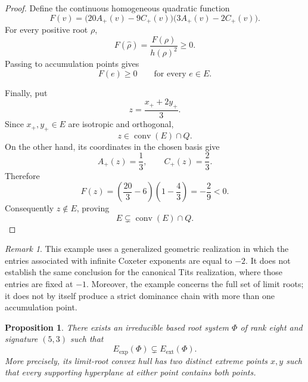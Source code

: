 \documentclass[11pt,reqno]{amsart}
\theoremstyle{plain}
\newtheorem{proposition}[theorem]{Proposition}
\theoremstyle{definition}
\theoremstyle{remark}
\newtheorem{remark}[theorem]{Remark}
\numberwithin{equation}{section}
\begin{document}
\begin{proof}
Define the continuous homogeneous quadratic function
\[
F(v)=
\bigl(20A_+(v)-9C_+(v)\bigr)
\bigl(3A_+(v)-2C_+(v)\bigr).
\]
For every positive root $\rho$,
\[
F(\widehat{\rho})=\frac{F(\rho)}{h(\rho)^2}\geq 0.
\]
Passing to accumulation points gives
\[
F(e)\geq 0
\qquad\text{for every }e\in E.
\]

Finally, put
\[
z=\frac{x_++2y_+}{3}.
\]
Since $x_+,y_+\in E$ are isotropic and orthogonal,
\[
z\in\operatorname{conv}(E)\cap Q.
\]
On the other hand, its coordinates in the chosen basis give
\[
A_+(z)=\frac13,
\qquad
C_+(z)=\frac23.
\]
Therefore
\[
F(z)
=
\left(\frac{20}{3}-6\right)
\left(1-\frac43\right)
=
-\frac29<0.
\]
Consequently $z\notin E$, proving
\[
E\subsetneq\operatorname{conv}(E)\cap Q.
\]
\end{proof}

\begin{remark}
This example uses a generalized geometric realization in
which the entries associated with infinite Coxeter exponents
are equal to $-2$.
It does not establish the same conclusion for the canonical
Tits realization, where those entries are fixed at $-1$.
Moreover, the example concerns the full set of limit roots;
it does not by itself produce a strict dominance chain with
more than one accumulation point.
\end{remark}
\begin{proposition}\label{prop:nonexposed-extreme-limit-roots}
There exists an irreducible based root system $\Phi$ of rank eight
and signature $(5,3)$ such that
\[
E_{\mathrm{exp}}(\Phi)
\subsetneq E_{\mathrm{ext}}(\Phi).
\]
More precisely, its limit-root convex hull has two distinct
extreme points $x,y$ such that every supporting hyperplane at
either point contains both points.
\end{proposition}
\end{document}
